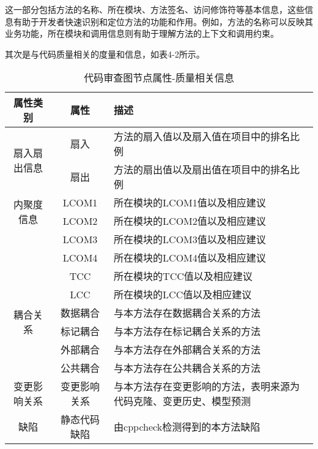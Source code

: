 这一部分包括方法的名称、所在模块、方法签名、访问修饰符等基本信息，这些信息有助于开发者快速识别和定位方法的功能和作用。例如，方法的名称可以反映其业务功能，所在模块和调用信息则有助于理解方法的上下文和调用约束。

其次是与代码质量相关的度量和信息，如表4-2所示。

\begin{table}[htbp]
    \caption{代码审查图节点属性-质量相关信息}
    \vspace{0.5em}\centering\wuhao
    \begin{tabular}{ccp{9cm}}
    \toprule
    属性类别 & 属性 & 描述 \\
    \midrule
    \multirow{2}{*}{扇入扇出信息}& 扇入 &  方法的扇入值以及扇入值在项目中的排名比例 \\       
                                & 扇出 &  方法的扇出值以及扇出值在项目中的排名比例 \\   \cline{2-3}
    \multirow{2}{*}{内聚度信息}& LCOM1 &  所在模块的LCOM1值以及相应建议 \\       
                                & LCOM2 &  所在模块的LCOM2值以及相应建议 \\    
                                & LCOM3 &  所在模块的LCOM3值以及相应建议 \\    
                                & LCOM4 &  所在模块的LCOM4值以及相应建议 \\    
                                & TCC &  所在模块的TCC值以及相应建议 \\    
                                & LCC &  所在模块的LCC值以及相应建议 \\   \cline{2-3}             
    \multirow{2}{*}{耦合关系}& 数据耦合 &  与本方法存在数据耦合关系的方法 \\       
                                & 标记耦合 &  与本方法存在标记耦合关系的方法 \\   
                                & 外部耦合 &  与本方法存在外部耦合关系的方法 \\   
                                & 公共耦合 &  与本方法存在公共耦合关系的方法 \\   \cline{2-3}
    变更影响关系 & 变更影响关系 &  与本方法存在变更影响的方法，表明来源为代码克隆、变更历史、模型预测 \\    \cline{2-3}
    缺陷 & 静态代码缺陷 &  由cppcheck检测得到的本方法缺陷 \\      
    \bottomrule
    \end{tabular}
    \end{table}

